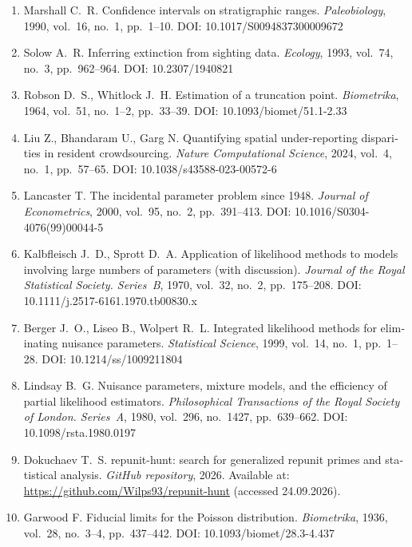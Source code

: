 \documentclass[11pt,a4paper]{article}
\theoremstyle{plain}
\theoremstyle{remark}
\begin{document}
\begin{otherlanguage}{english}
\begin{enumerate}
\item Marshall C.~R. Confidence intervals on stratigraphic ranges.
\emph{Paleobiology}, 1990, vol.~16, no.~1, pp.~1--10.
DOI: 10.1017/S0094837300009672

\item Solow A.~R. Inferring extinction from sighting data. \emph{Ecology},
1993, vol.~74, no.~3, pp.~962--964. DOI: 10.2307/1940821

\item Robson D.~S., Whitlock J.~H. Estimation of a truncation point.
\emph{Biometrika}, 1964, vol.~51, no.~1--2, pp.~33--39.
DOI: 10.1093/biomet/51.1-2.33

\item Liu Z., Bhandaram U., Garg N. Quantifying spatial under-reporting
disparities in resident crowdsourcing. \emph{Nature Computational Science},
2024, vol.~4, no.~1, pp.~57--65. DOI: 10.1038/s43588-023-00572-6

\item Lancaster T. The incidental parameter problem since 1948. \emph{Journal
of Econometrics}, 2000, vol.~95, no.~2, pp.~391--413.
DOI: 10.1016/S0304-4076(99)00044-5

\item Kalbfleisch J.~D., Sprott D.~A. Application of likelihood methods to
models involving large numbers of parameters (with discussion). \emph{Journal
of the Royal Statistical Society. Series~B}, 1970, vol.~32, no.~2,
pp.~175--208. DOI: 10.1111/j.2517-6161.1970.tb00830.x

\item Berger J.~O., Liseo B., Wolpert R.~L. Integrated likelihood methods for
eliminating nuisance parameters. \emph{Statistical Science}, 1999, vol.~14,
no.~1, pp.~1--28. DOI: 10.1214/ss/1009211804

\item Lindsay B.~G. Nuisance parameters, mixture models, and the efficiency of
partial likelihood estimators. \emph{Philosophical Transactions of the Royal
Society of London. Series~A}, 1980, vol.~296, no.~1427, pp.~639--662.
DOI: 10.1098/rsta.1980.0197

\item Dokuchaev T.~S. repunit-hunt: search for generalized repunit primes and
statistical analysis. \emph{GitHub repository}, 2026. Available at:
\url{https://github.com/Wilps93/repunit-hunt} (accessed 24.09.2026).

\item Garwood F. Fiducial limits for the Poisson distribution.
\emph{Biometrika}, 1936, vol.~28, no.~3--4, pp.~437--442.
DOI: 10.1093/biomet/28.3-4.437
\end{enumerate}
\end{otherlanguage}
\end{document}
